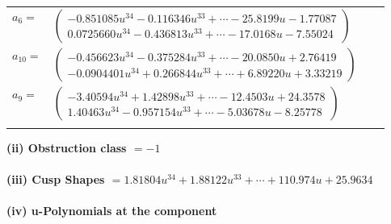 \documentclass[1p]{elsarticle_modified}
\theoremstyle{definition}
\begin{document}
\begin{tabular}{m{7pt} m{180pt} m{7pt} m{180pt} }
\flushright $a_{6}=$&$\begin{pmatrix}-0.851085 u^{34}-0.116346 u^{33}+\cdots-25.8199 u-1.77087\\0.0725660 u^{34}-0.436813 u^{33}+\cdots-17.0168 u-7.55024\end{pmatrix}$ \\
\flushright $a_{10}=$&$\begin{pmatrix}-0.456623 u^{34}-0.375284 u^{33}+\cdots-20.0850 u+2.76419\\-0.0904401 u^{34}+0.266844 u^{33}+\cdots+6.89220 u+3.33219\end{pmatrix}$ \\
\flushright $a_{9}=$&$\begin{pmatrix}-3.40594 u^{34}+1.42898 u^{33}+\cdots-12.4503 u+24.3578\\1.40463 u^{34}-0.957154 u^{33}+\cdots-5.03678 u-8.25778\end{pmatrix}$\\&\end{tabular}
\flushleft \textbf{(ii) Obstruction class $= -1$}\\~\\
\flushleft \textbf{(iii) Cusp Shapes $= 1.81804 u^{34}+1.88122 u^{33}+\cdots+110.974 u+25.9634$}\\~\\
\newpage\renewcommand{\arraystretch}{1}
\flushleft \textbf{(iv) u-Polynomials at the component}\newline \\
\end{document}
